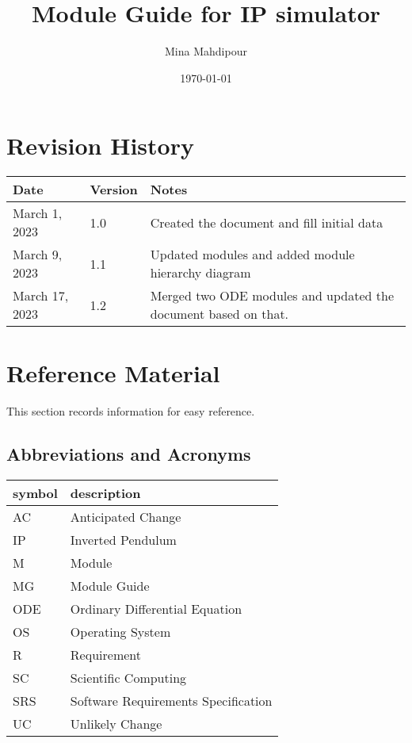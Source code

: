 \documentclass[12pt, titlepage]{article}
\begin{document}
\title{Module Guide for IP simulator} 
\author{Mina Mahdipour}
\date{\today}

\maketitle


\section{Revision History}

\begin{tabularx}{\textwidth}{p{3cm}p{2cm}X}
\toprule {\bf Date} & {\bf Version} & {\bf Notes}\\
\midrule
March 1, 2023 & 1.0 & Created the document and fill initial data\\
March 9, 2023 & 1.1 & Updated modules and added module hierarchy diagram\\
March 17, 2023 & 1.2 & Merged two ODE modules and updated the document based on that.\\
\bottomrule
\end{tabularx}

\newpage

\section{Reference Material}

This section records information for easy reference.

\subsection{Abbreviations and Acronyms}

\renewcommand{\arraystretch}{1.2}
\begin{tabular}{l l} 
  \toprule		
  \textbf{symbol} & \textbf{description}\\
  \midrule 
  AC & Anticipated Change\\
  IP & Inverted Pendulum\\
  M & Module \\
  MG & Module Guide \\
  ODE & Ordinary Differential Equation\\
  OS & Operating System \\
  R & Requirement\\
  SC & Scientific Computing \\
  SRS & Software Requirements Specification\\
  UC & Unlikely Change \\

  \bottomrule
\end{tabular}\\
\end{document}
